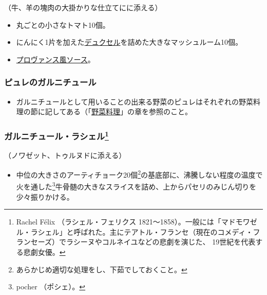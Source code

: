 \begin{recette}
（牛、羊の塊肉の大掛かりな仕立てにに添える）

\begin{itemize}
\item
  丸ごとの小さなトマト10個。
\item
  にんにく1片を加えた\protect\hyperlink{duxelles-seche}{デュクセル}を詰めた大きなマッシュルーム10個。
\item
  \protect\hyperlink{sauce-provencale}{プロヴァンス風ソース}。
\end{itemize}

\hypertarget{garniture-de-purees}{%
\subsubsection{ピュレのガルニチュール}\label{garniture-de-purees}}



\begin{itemize}
\tightlist
\item
  ガルニチュールとして用いることの出来る野菜のピュレはそれぞれの野菜料理の節に記してある（「\protect\hyperlink{legumes}{野菜料理}」の章を参照のこと。
\end{itemize}

\hypertarget{garniture-rachel}{%
\subsubsection[ガルニチュール・ラシェル]{\texorpdfstring{ガルニチュール・ラシェル\footnote{Rachel
  Félix （ラシェル・フェリクス
  1821〜1858）。一般には「マドモワゼル・ラシェル」と呼ばれた。主にテアトル・フランセ（現在のコメディ・フランセーズ）でラシーヌやコルネイユなどの悲劇を演じた、
  19世紀を代表する悲劇女優。}}{ガルニチュール・ラシェル}}\label{garniture-rachel}}



（ノワゼット、トゥルヌドに添える）

\begin{itemize}
\tightlist
\item
  中位の大きさのアーティチョーク20個\footnote{あらかじめ適切な処理をし、下茹でしておくこと。}の基底部に、沸騰しない程度の温度で火を通した\footnote{pocher
    （ポシェ）。}牛骨髄の大きなスライスを詰め、上からパセリのみじん切りを少々振りかける。
\end{itemize}
\end{recette}